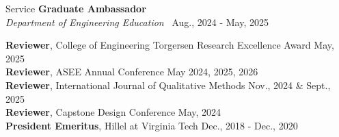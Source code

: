 \documentclass{resume}
\begin{document}
\begin{rSection}{Service}
{\bf Graduate Ambassador}\\
\emph{Department of Engineering Education} \hfill {\ Aug., 2024 - May, 2025}

{\textbf {Reviewer}, College of Engineering Torgersen Research Excellence Award} \hfill {May, 2025} \\[0.5ex]
{\textbf {Reviewer}, ASEE Annual Conference} \hfill {May 2024, 2025, 2026} \\[0.5ex]
{\textbf {Reviewer}, International Journal of Qualitative Methods} \hfill {Nov., 2024 \& Sept., 2025} \\[0.5ex]
{\textbf {Reviewer}, Capstone Design Conference} \hfill {May, 2024} \\[0.5ex]
{\textbf {President Emeritus}, Hillel at Virginia Tech} \hfill {Dec., 2018 - Dec., 2020}
\end{rSection}

\end{document}
